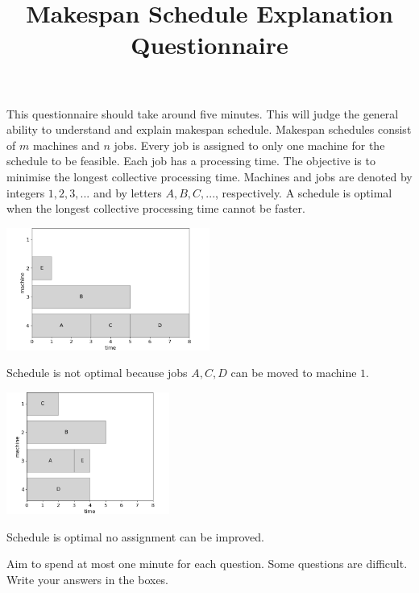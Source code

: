 \documentclass[10pt,a4paper]{article}
\title{Makespan Schedule Explanation Questionnaire}
\date{}
\author{}
\begin{document}
\maketitle
\vspace{-4\baselineskip}
\noindent\hrulefill

\noindent This questionnaire should take around five minutes. This will judge the general ability to understand and explain makespan schedule. Makespan schedules consist of $m$ machines and $n $ jobs. Every job is assigned to only one machine for the schedule to be feasible. Each job has a processing time. The objective is to minimise the longest collective processing time. Machines and jobs are denoted by integers $1,2,3,...$ and by letters $A,B,C,...$, respectively. A schedule is optimal when the longest collective processing time cannot be faster.

\begin{multicols}{2}
	\includegraphics[width=0.5\textwidth]{figures/makespan_unoptimal}
	\begin{center}
		Schedule is not optimal because jobs $A,C,D$ can be moved to machine $1$.
	\end{center}
	\includegraphics[width=0.4\textwidth]{figures/makespan_optimal}
	\begin{center}
		Schedule is optimal no assignment can be improved.
	\end{center}
\end{multicols}

\vspace{-\baselineskip}
\noindent\hrulefill

\noindent Aim to spend at most one minute for each question. Some questions are difficult. Write your answers in the boxes.
\end{document}
